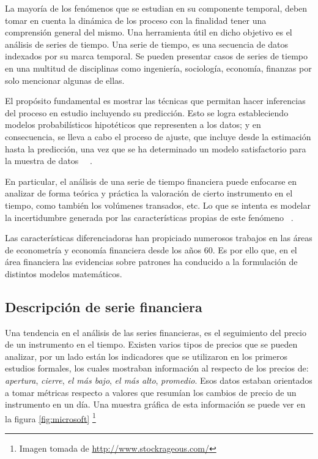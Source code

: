La mayoría de los fenómenos que se estudian en su componente temporal, deben
tomar en cuenta la dinámica de los proceso con la finalidad tener una
comprensión general del mismo. Una herramienta útil en dicho objetivo es el
análisis de series de tiempo. Una serie de tiempo, es una secuencia de datos
indexados por su marca temporal. Se pueden presentar casos de series de tiempo
en una multitud de disciplinas como ingeniería, sociología, economía, finanzas
por solo mencionar algunas de ellas.

El propósito fundamental es mostrar las técnicas que permitan hacer inferencias
del proceso en estudio incluyendo su predicción. Esto se logra estableciendo
modelos probabilísticos hipotéticos que representen a los datos; y en
consecuencia, se lleva a cabo el proceso de ajuste, que incluye desde la
estimación hasta la predicción, una vez que se ha determinado un modelo
satisfactorio para la muestra de datos~\cite{box2011time}
~\cite{vandaele1983applied}. 

En particular, el análisis de una serie de tiempo financiera puede enfocarse en
analizar de forma teórica y práctica la valoración de cierto instrumento en el
tiempo, como también los volúmenes transados, etc. Lo que se intenta es modelar
la incertidumbre generada por las características propias de este fenómeno
~\cite{tsay2005analysis}. 

Las características diferenciadoras han propiciado numerosos trabajos en las
áreas de econometría y economía financiera desde los años 60. Es por ello que,
en el área financiera las evidencias sobre patrones ha conducido a la
formulación de distintos modelos matemáticos.

\subsection{Descripción de serie financiera}

Una tendencia en el análisis de las series financieras, es el seguimiento del
precio de un instrumento en el tiempo.
Existen varios tipos de precios que se pueden analizar, por un lado están los
indicadores que se utilizaron en los primeros estudios formales, los cuales
mostraban información al respecto de los precios de: \emph{apertura},
\emph{cierre}, \emph{el más bajo}, \emph{el más alto}, \emph{promedio}. Esos
datos estaban orientados a tomar métricas respecto a valores que resumían los
cambios de precio de un instrumento en un día. Una muestra gráfica de esta
información se puede ver en la figura \ref{fig:microsoft} \footnote{Imagen
tomada de \url{http://www.stockrageous.com/}}

